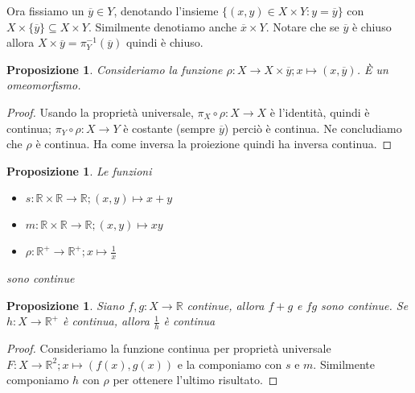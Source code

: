 \documentclass{article}
\newcounter{theo}[section]\setcounter{theo}{0}
\theoremstyle{plain}
\newtheorem{proposition}[theo]{Proposizione}
\theoremstyle{definition}
\theoremstyle{remark}
\begin{document}
Ora fissiamo un \(\overline{y} \in Y\), denotando l'insieme \(\{(x, y) \in X
\times Y : y = \overline{y}\} \) con \(X \times \{\overline{y}\}  \subseteq X
\times Y \). Similmente denotiamo anche \(\overline{x} \times Y \). Notare che
se \(\overline{y}\) è chiuso allora \(X \times \overline{y} =
\pi_Y^{-1}(\overline{y})\) quindi è chiuso.
\begin{proposition}
    Consideriamo la funzione \(\rho : X \to X \times \overline{y}; x \mapsto (x,
    \overline{y})\). È un omeomorfismo.
\end{proposition}
\begin{proof}
    Usando la proprietà universale, \(\pi_X \circ \rho : X \to X\) è l'identità,
    quindi è continua; \(\pi_Y \circ \rho : X \to Y\) è costante (sempre
    \(\overline{y}\)) perciò è continua. Ne concludiamo che \(\rho\) è continua.
    Ha come inversa la proiezione quindi ha inversa continua.
\end{proof}

\begin{proposition}
    Le funzioni
\begin{itemize}[label = --]
    \item \(s: \mathbb{R}\times \mathbb{R} \to \mathbb{R}; (x, y) \mapsto x+y\)
    \item \(m: \mathbb{R}\times \mathbb{R} \to \mathbb{R}; (x,y) \mapsto xy\) 
    \item \(\rho: \mathbb{R}^{+} \to \mathbb{R}^{+}; x \mapsto \frac{1}{x}\) 
\end{itemize}
sono continue
\end{proposition}

\begin{proposition}
    Siano \(f, g: X \to \mathbb{R}\) continue, allora \(f+g\) e \(fg\) sono
    continue. Se \(h: X \to \mathbb{R}^{+}\) è continua, allora \(\frac{1}{h}\)
    è continua
\end{proposition}

\begin{proof}
    Consideriamo la funzione continua per proprietà universale \(F: X \to
    \mathbb{R}^2; x \mapsto (f(x),
    g(x))\) e la componiamo con \(s\) e \(m\). Similmente componiamo \(h\) con
    \(\rho\) per ottenere l'ultimo risultato.
\end{proof}
\end{document}

